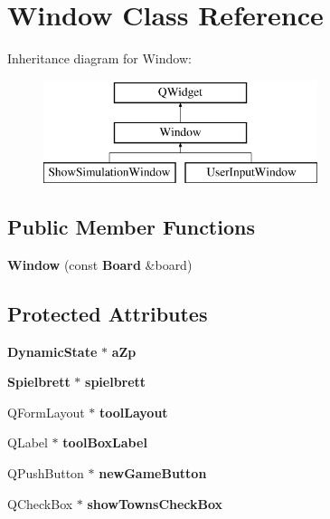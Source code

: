 \section{Window Class Reference}
\label{class_window}
Inheritance diagram for Window\-:\begin{figure}[H]
\begin{center}
\leavevmode
\includegraphics[height=3.000000cm]{class_window}
\end{center}
\end{figure}
\subsection*{Public Member Functions}
\begin{DoxyCompactItemize}
\item 
{\bf Window} (const {\bf Board} \&board)
\end{DoxyCompactItemize}
\subsection*{Protected Attributes}
\begin{DoxyCompactItemize}
\item 
{\bf Dynamic\-State} $\ast$ {\bfseries a\-Zp}\label{class_window_aaa03b9cfa8a9e80463cdf13971645183}

\item 
{\bf Spielbrett} $\ast$ {\bfseries spielbrett}\label{class_window_a7159f373a53e01ba489092f2e381c245}

\item 
Q\-Form\-Layout $\ast$ {\bfseries tool\-Layout}\label{class_window_a7864a9891249e0e918d6ee5741a95a96}

\item 
Q\-Label $\ast$ {\bf tool\-Box\-Label}
\item 
Q\-Push\-Button $\ast$ {\bfseries new\-Game\-Button}\label{class_window_ab85826e5d46ea16c3b9f91b966bec9a2}

\item 
Q\-Check\-Box $\ast$ {\bfseries show\-Towns\-Check\-Box}\label{class_window_a8412b9181c563862e596c3dd6c7d9cbf}

\end{DoxyCompactItemize}
